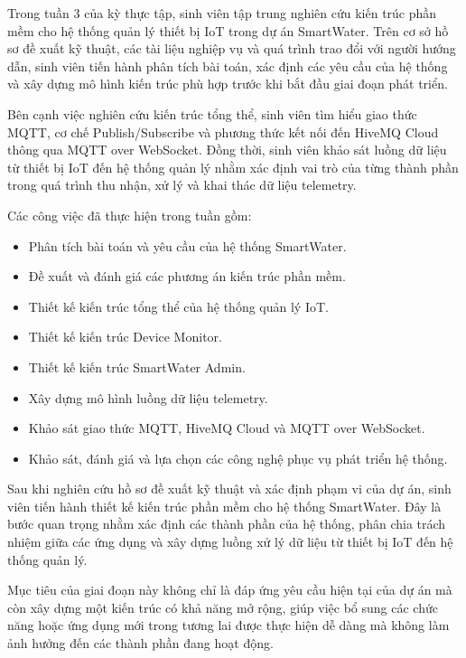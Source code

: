 

Trong tuần 3 của kỳ thực tập, sinh viên tập trung nghiên cứu kiến trúc phần mềm cho hệ thống quản lý thiết bị IoT trong dự án SmartWater. Trên cơ sở hồ sơ đề xuất kỹ thuật, các tài liệu nghiệp vụ và quá trình trao đổi với người hướng dẫn, sinh viên tiến hành phân tích bài toán, xác định các yêu cầu của hệ thống và xây dựng mô hình kiến trúc phù hợp trước khi bắt đầu giai đoạn phát triển.

Bên cạnh việc nghiên cứu kiến trúc tổng thể, sinh viên tìm hiểu giao thức MQTT, cơ chế Publish/Subscribe và phương thức kết nối đến HiveMQ Cloud thông qua MQTT over WebSocket. Đồng thời, sinh viên khảo sát luồng dữ liệu từ thiết bị IoT đến hệ thống quản lý nhằm xác định vai trò của từng thành phần trong quá trình thu nhận, xử lý và khai thác dữ liệu telemetry.

Các công việc đã thực hiện trong tuần gồm:

\begin{itemize}
    \item Phân tích bài toán và yêu cầu của hệ thống SmartWater.
    \item Đề xuất và đánh giá các phương án kiến trúc phần mềm.
    \item Thiết kế kiến trúc tổng thể của hệ thống quản lý IoT.
    \item Thiết kế kiến trúc Device Monitor.
    \item Thiết kế kiến trúc SmartWater Admin.
    \item Xây dựng mô hình luồng dữ liệu telemetry.
    \item Khảo sát giao thức MQTT, HiveMQ Cloud và MQTT over WebSocket.
    \item Khảo sát, đánh giá và lựa chọn các công nghệ phục vụ phát triển hệ thống.
\end{itemize}

Sau khi nghiên cứu hồ sơ đề xuất kỹ thuật và xác định phạm vi của dự án, sinh viên tiến hành thiết kế kiến trúc phần mềm cho hệ thống SmartWater. Đây là bước quan trọng nhằm xác định các thành phần của hệ thống, phân chia trách nhiệm giữa các ứng dụng và xây dựng luồng xử lý dữ liệu từ thiết bị IoT đến hệ thống quản lý.

Mục tiêu của giai đoạn này không chỉ là đáp ứng yêu cầu hiện tại của dự án mà còn xây dựng một kiến trúc có khả năng mở rộng, giúp việc bổ sung các chức năng hoặc ứng dụng mới trong tương lai được thực hiện dễ dàng mà không làm ảnh hưởng đến các thành phần đang hoạt động.

